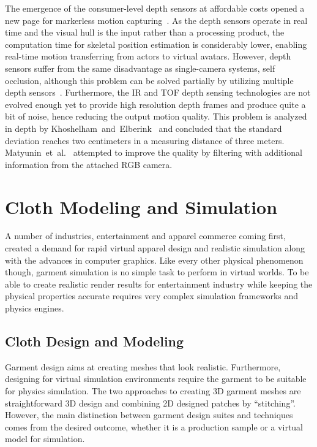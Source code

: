  The emergence of the consumer-level depth sensors at affordable costs opened a new page for markerless motion capturing~\cite{Dutta2012}. As the depth sensors operate in real time  and the visual hull is the input rather than a processing product, the computation time for skeletal position estimation is considerably lower, enabling  real-time motion transferring from actors to virtual avatars. However, depth sensors suffer from the same disadvantage as single-camera systems, self occlusion, although this problem can be solved partially by utilizing multiple depth sensors~\cite{Berger2011}. Furthermore, the IR and TOF depth sensing technologies are not evolved enough yet to provide high resolution depth frames and produce quite a bit of noise, hence reducing the output motion quality. This problem is analyzed in depth by Khoshelham~and~Elberink~\cite{Khoshelham2012} and concluded that the standard deviation reaches two centimeters in a measuring distance of three meters. Matyunin~et~al.~\cite{Matyunin2011} attempted to improve the 
quality by filtering with additional information from the attached RGB camera.   
 
\section{Cloth Modeling and Simulation}
 
A number of industries, entertainment and apparel commerce coming first, created a demand for rapid virtual apparel design and realistic simulation along with the advances in computer graphics. Like every other physical phenomenon though, garment simulation is no simple task to perform in virtual worlds. To be able to create realistic render results for entertainment industry while keeping the physical properties accurate requires very complex simulation frameworks and physics engines. 
 
\subsection{Cloth Design and Modeling}
 
Garment design aims at creating meshes that look realistic. Furthermore, designing for virtual simulation environments require the garment to be suitable for physics simulation. The two approaches to creating 3D garment meshes are straightforward 3D design and combining 2D designed patches by ``stitching''. However, the main distinction between garment design suites and techniques comes from the desired outcome, whether it is a production sample or a virtual model for simulation.
 
